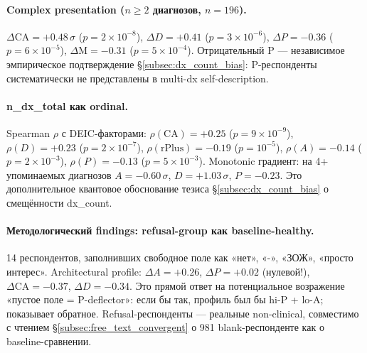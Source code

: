 \paragraph{Complex presentation ($n \geq 2$ диагнозов, $n = 196$).} $\Delta \text{CA} = +0.48\,\sigma$ ($p = 2 \times 10^{-8}$), $\Delta D = +0.41$ ($p = 3 \times 10^{-6}$), \textbf{$\Delta P = -0.36$} ($p = 6 \times 10^{-5}$), $\Delta \text{M} = -0.31$ ($p = 5 \times 10^{-4}$). Отрицательный P --- независимое эмпирическое подтверждение §\ref{subsec:dx_count_bias}: P-респонденты систематически не представлены в multi-dx self-description.

\paragraph{n\_dx\_total как ordinal.} Spearman $\rho$ с DEIC-факторами: $\rho(\text{CA}) = +0.25$ ($p = 9 \times 10^{-9}$), $\rho(D) = +0.23$ ($p = 2 \times 10^{-7}$), $\rho(\text{rPlus}) = -0.19$ ($p = 10^{-5}$), $\rho(A) = -0.14$ ($p = 2 \times 10^{-3}$), $\rho(P) = -0.13$ ($p = 5 \times 10^{-3}$). Monotonic градиент: на 4+ упоминаемых диагнозов $A = -0.60\,\sigma$, $D = +1.03\,\sigma$, $P = -0.23$. Это дополнительное квантовое обоснование тезиса §\ref{subsec:dx_count_bias} о смещённости dx\_count.

\paragraph{Методологический findings: refusal-group как baseline-healthy.} 14 респондентов, заполнивших свободное поле как «нет», «-», «ЗОЖ», «просто интерес». Architectural profile: $\Delta A = +0.26$, $\Delta P = +0.02$ (нулевой!), $\Delta \text{CA} = -0.37$, $\Delta D = -0.34$. Это прямой ответ на потенциальное возражение «пустое поле = P-deflector»: если бы так, профиль был бы hi-P + lo-A; показывает обратное. Refusal-респонденты --- реальные non-clinical, совместимо с чтением §\ref{subsec:free_text_convergent} о 981 blank-респонденте как о baseline-сравнении.

